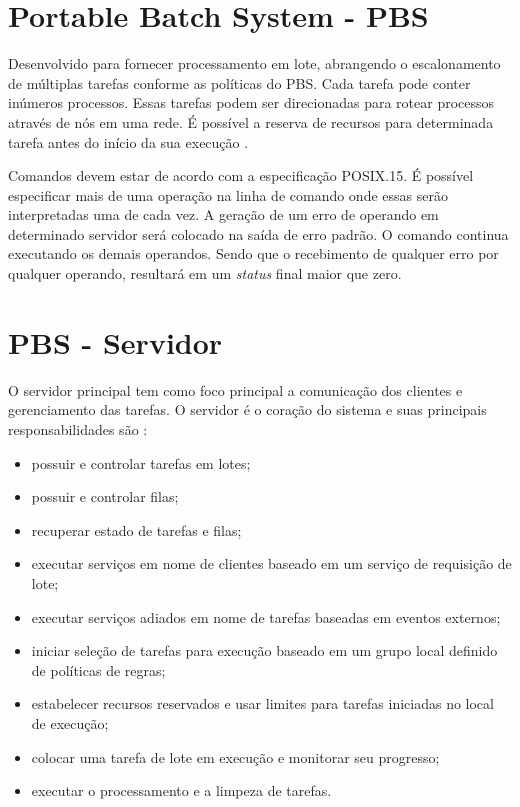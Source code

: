 \section{Portable Batch System - PBS}

Desenvolvido para fornecer processamento em lote, abrangendo o escalonamento de múltiplas tarefas conforme as políticas do PBS. Cada tarefa pode conter inúmeros processos. Essas tarefas podem ser direcionadas para rotear processos através de nós em uma rede. É possível a reserva de recursos para determinada tarefa antes do início da sua execução \cite{Bayucan1998a}.

Comandos devem estar de acordo com a especificação POSIX.15. É possível especificar mais de uma operação na linha de comando onde essas serão interpretadas uma de cada vez. A geração de um erro de operando em determinado servidor será colocado na saída de erro padrão. O comando continua executando os demais operandos. Sendo que o recebimento de qualquer erro por qualquer operando, resultará em um \emph{status} final maior que zero.

\section{PBS - Servidor}

O servidor principal tem como foco principal a comunicação dos clientes e gerenciamento das tarefas. O servidor é o coração do sistema e suas principais responsabilidades são \cite{Bayucan1998a}:

\begin{itemize}
	\item possuir e controlar tarefas em lotes;
	\item possuir e controlar filas;
	\item recuperar estado de tarefas e filas;
	\item executar serviços em nome de clientes baseado em um serviço de requisição de lote;
	\item executar serviços adiados em nome de tarefas baseadas em eventos externos;
	\item iniciar seleção de tarefas para execução baseado em um grupo local definido de políticas de regras;
	\item estabelecer recursos reservados e usar limites para tarefas iniciadas no local de execução;
	\item colocar uma tarefa de lote em execução e monitorar seu progresso;
	\item executar o processamento e a limpeza de tarefas.
\end{itemize}

